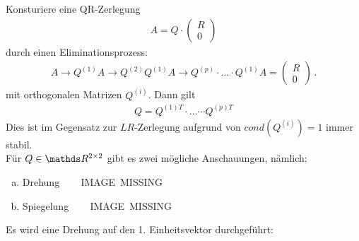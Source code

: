 Konsturiere eine QR-Zerlegung
\begin{gather}
  A= Q\cdot \begin{pmatrix} R\\0 \end{pmatrix}
  \label{IV.4.1}
\end{gather}
durch einen Eliminationsprozess:
\begin{gather}
  A \rightarrow Q^{(1)}A \rightarrow Q^{(2)} Q^{(1)}A \rightarrow Q^{(p)}\cdot \dotsc \cdot Q^{(1)}A
  = \begin{pmatrix} R\\0 \end{pmatrix}\, .
  \label{IV.4.2}
\end{gather}
mit orthogonalen Matrizen $Q^{(i)}$.
Dann gilt
\begin{gather}
  Q= Q^{(1)T}\cdot \dotsc \cdots {Q^{(p)T}}
  \label{IV.4.3}
\end{gather}
Dies ist im Gegensatz zur $LR$-Zerlegung aufgrund von $cond(Q^{(i)})= 1$ immer stabil.\\

Für $Q\in\R^{2\times 2}$ gibt es zwei mögliche Anschauungen, nämlich:
\begin{enumerate}[a)]
\item Drehung ~~~ IMAGE~MISSING\label{im4.4(1)}
\item Spiegelung ~~~ IMAGE~MISSING\label{im4.4(2)}
\end{enumerate}

Es wird eine Drehung auf den 1. Einheitsvektor durchgeführt:
\label{im4.4.a}


